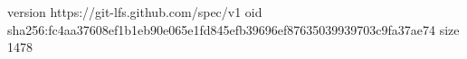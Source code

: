 version https://git-lfs.github.com/spec/v1
oid sha256:fc4aa37608ef1b1eb90e065e1fd845efb39696ef87635039939703c9fa37ae74
size 1478
